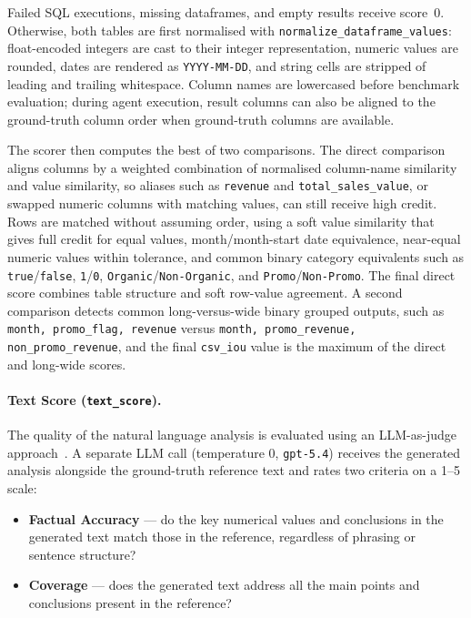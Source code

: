 Failed SQL executions, missing dataframes, and empty results receive score~0.
Otherwise, both tables are first normalised with
\texttt{normalize\_dataframe\_values}: float-encoded integers are cast to their
integer representation, numeric values are rounded, dates are rendered as
\texttt{YYYY-MM-DD}, and string cells are stripped of leading and trailing
whitespace. Column names are lowercased before benchmark evaluation; during
agent execution, result columns can also be aligned to the ground-truth column
order when ground-truth columns are available.

The scorer then computes the best of two comparisons. The direct comparison
aligns columns by a weighted combination of normalised column-name similarity
and value similarity, so aliases such as \texttt{revenue} and
\texttt{total\_\allowbreak sales\_\allowbreak value}, or swapped numeric columns with matching values,
can still receive high credit. Rows are matched without assuming order, using a
soft value similarity that gives full credit for equal values, month/month-start
date equivalence, near-equal numeric values within tolerance, and common binary
category equivalents such as \texttt{true}/\texttt{false},
\texttt{1}/\texttt{0}, \texttt{Organic}/\texttt{Non-Organic}, and
\texttt{Promo}/\texttt{Non-Promo}. The final direct score combines table
structure and soft row-value agreement. A second comparison detects common
long-versus-wide binary grouped outputs, such as
\texttt{month, promo\_flag, revenue} versus
\texttt{month, promo\_revenue, non\_promo\_revenue}, and the final
\texttt{csv\_iou} value is the maximum of the direct and long-wide scores.

\paragraph{Text Score (\texttt{text\_score}).}
The quality of the natural language analysis is evaluated using an LLM-as-judge
approach~\cite{zheng2023judging}. A separate LLM call (temperature 0, \texttt{gpt-5.4})
receives the generated analysis alongside the ground-truth reference text
and rates two criteria on a 1--5 scale:

\begin{itemize}
    \item \textbf{Factual Accuracy} — do the key numerical values and conclusions in
          the generated text match those in the reference, regardless of phrasing or
          sentence structure?
    \item \textbf{Coverage} — does the generated text address all the main points
          and conclusions present in the reference?
\end{itemize}

